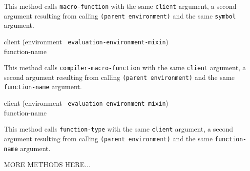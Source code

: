 This method calls \texttt{macro-function} with the same \texttt{client}
argument, a second argument resulting from calling \texttt{(parent
  environment)} and the same \texttt{symbol} argument.

{\small{} {client (environment {\tt
      evaluation-environment-mixin}) \\ function-name}
}

This method calls \texttt{compiler-macro-function} with the same
\texttt{client} argument, a second argument resulting from calling
\texttt{(parent environment)} and the same \texttt{function-name} argument.

{\small{} {client (environment {\tt
      evaluation-environment-mixin}) \\ function-name}
}

This method calls \texttt{function-type} with the same \texttt{client}
argument, a second argument resulting from calling \texttt{(parent
  environment)} and the same \texttt{function-name} argument.

MORE METHODS HERE...
